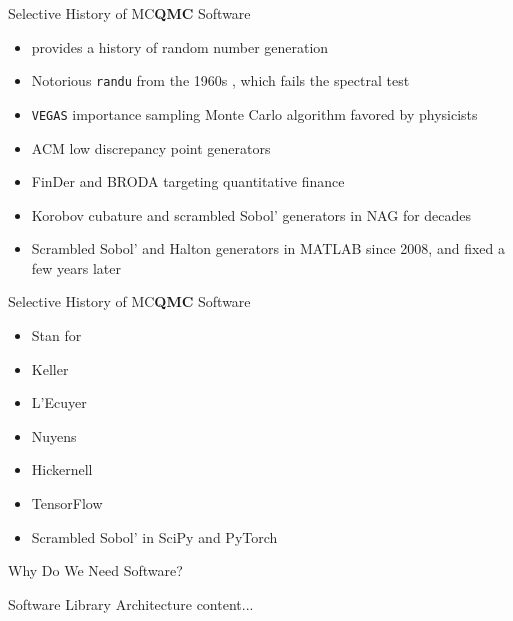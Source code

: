 \documentclass[11pt,compress,xcolor={usenames,dvipsnames},aspectratio=169]{beamer}
\begin{document}
\begin{frame}{Selective History of MC\textbf{QMC} Software}
	\vspace{-6ex}
	\begin{itemize}
		\item \textcite{LEc2017a} provides a history of \alert{random number generation}
		\item Notorious \alert{\texttt{randu}} from the 1960s \parencite{RANDU}, which fails the spectral test
		\item \alert{\texttt{VEGAS}} \parencite{Lep78a, Lep21a} importance sampling Monte Carlo algorithm favored by physicists
		\item \alert{ACM} low discrepancy point generators \parencite{BraFox88,BraFoxNie92,HonHic00a}
		\item \alert{FinDer} \parencite{PasTra95,FinDer} and \alert{BRODA} \parencite{BRODA20a} targeting quantitative finance
		\item Korobov cubature and scrambled Sobol' generators in \alert{NAG} \parencite{NAG27} for decades		
		\item Scrambled Sobol' and Halton generators in MATLAB \parencite{MAT9.13} since 2008, and fixed a few years later
	\end{itemize}
\end{frame}

\begin{frame}{Selective History of MC\textbf{QMC} Software}
	\vspace{-6ex}
	\begin{itemize}
		\item Stan \cite{STAN} for 
		\item Keller
		\item L'Ecuyer
		\item Nuyens
		\item Hickernell
		\item TensorFlow
		\item Scrambled Sobol' in SciPy \parencite{virtanen2020scipy} and PyTorch \parencite{paszke2019pytorch}
		
		
	\end{itemize}
\end{frame}

\begin{frame}{Why Do We Need Software?}
\end{frame}

\begin{frame}{Software Library Architecture}
	content...
\end{frame}
\end{document}

